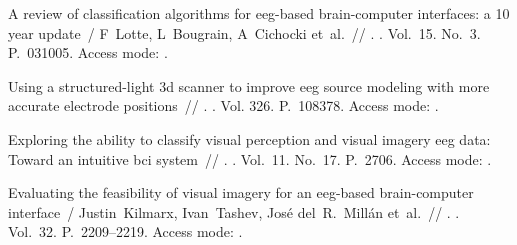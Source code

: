 
\makeatletter
\expandafter\long\expandafter\gdef\csname fullcite@10.1088/1741-2552/aab2f2\endcsname{%
A review of classification algorithms for eeg-based brain-computer interfaces:
  a 10 year update~/ F~Lotte, L~Bougrain, A~Cichocki et~al.~//
  \href{http://dx.doi.org/10.1088/1741-2552/aab2f2}{}. \BibDash
{}. \BibDash
\newblock Vol.~15. No.~3. \BibDash
\newblock P.~031005. \BibDash
\newblock Access mode: .
}

\expandafter\long\expandafter\gdef\csname fullcite@10.1016/j.jneumeth.2019.108378\endcsname{%
 Using a structured-light 3d scanner to
  improve eeg source modeling with more accurate electrode positions~//
  \href{http://dx.doi.org/10.1016/j.jneumeth.2019.108378}{}. \BibDash
{}. \BibDash
\newblock Vol. 326. \BibDash
\newblock P.~108378. \BibDash
\newblock Access mode:
  .
}

\expandafter\long\expandafter\gdef\csname fullcite@10.3390/electronics11172706\endcsname{%
 Exploring the ability to classify visual
  perception and visual imagery eeg data: Toward an intuitive bci system~//
  \href{http://dx.doi.org/10.3390/electronics11172706}{}.
  \BibDash
{}. \BibDash
\newblock Vol.~11. No.~17. \BibDash
\newblock P.~2706. \BibDash
\newblock Access mode: .
}

\expandafter\long\expandafter\gdef\csname fullcite@10.1109/tnsre.2024.3410870\endcsname{%
Evaluating the feasibility of visual imagery for an eeg-based brain-computer
  interface~/ Justin~Kilmarx, Ivan~Tashev, José del~R.~Millán et~al.~//
  \href{http://dx.doi.org/10.1109/tnsre.2024.3410870}{}. \BibDash
{}. \BibDash
\newblock Vol.~32. \BibDash
\newblock P.~2209--2219. \BibDash
\newblock Access mode: .
}

